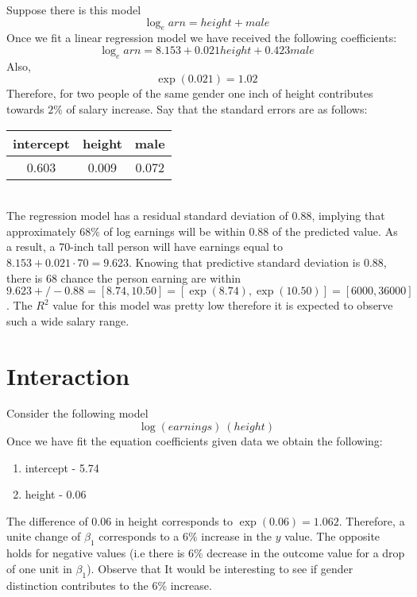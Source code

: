 \documentclass{article}
\begin{document}
Suppose there is this model
\begin{equation}
\log_earn = height + male
\end{equation}
Once we fit a linear regression model we have received the following coefficients:
\begin{equation}
\log_earn = 8.153 + 0.021height + 0.423male
\end{equation}
Also,
\begin{equation}
 \exp(0.021) = 1.02
\end{equation}
Therefore, for two people of the same gender one inch of height contributes towards $2\%$ of salary increase. Say that the standard errors are as follows:
\begin{tabular}{|c|c|c|}
\hline 
intercept& height & male \\ \hline 
0.603 & 0.009  & 0.072\\ 
\hline 
\end{tabular} 
\\
\indent
The regression model has a residual standard deviation of $0.88$, implying that approximately $68\%$ of log earnings will be within $0.88$ of the predicted value. As a result, a 70-inch tall person will have earnings equal to $8.153 + 0.021 \cdot 70 = 9.623$. Knowing that predictive standard deviation is $0.88$, there is $68$ chance the person earning are within $9.623 +/- 0.88= [8.74, 10.50]= [\exp(8.74), \exp(10.50)] = [6000, 36000]$. The $R^2$ value for this model was pretty low therefore it is expected to observe such a wide salary range.
\section{Interaction}

Consider the following model
\begin{equation}
\log( earnings ) ~ (height)
\end{equation}
Once we have fit the equation coefficients given data we obtain the following:
\begin{enumerate}
\item intercept - 5.74
\item height - 0.06
\end{enumerate}
The difference of $0.06$ in height corresponds to $\exp(0.06)=1.062$. Therefore, a unite change of $\beta_1$ corresponds to a $6\%$ increase in the $y$ value. The opposite holds for negative values (i.e there is $6\%$ decrease in the outcome value for a drop of one unit in $\beta_1$). Observe that It would be interesting to see if gender distinction contributes to the $6\%$ increase.
\end{document}
